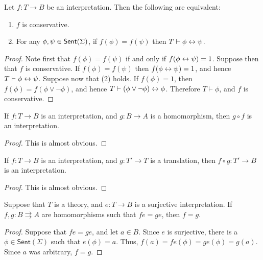 \begin{lemma} Let $f:T\to B$ be an interpretation.  Then the following
  are equivalent:
  \begin{enumerate}
\item $f$ is conservative.
\item For any $\phi ,\psi\in\mathsf{Sent}(\Sigma )$, if $f(\phi )=f(\psi )$ then
  $T\vdash \phi\leftrightarrow\psi$. \end{enumerate} \end{lemma}

\begin{proof} Note first that $f(\phi )=f(\psi )$ if and only if
  $f(\phi\leftrightarrow \psi)=1$.  Suppose then that $f$ is conservative.  If
  $f(\phi )=f(\psi )$ then $f(\phi\leftrightarrow\psi )=1$, and hence
  $T\vdash\phi\leftrightarrow\psi$.  Suppose now that (2) holds.  If $f(\phi
  )=1$, then $f(\phi )=f(\phi\vee\neg\phi )$, and hence $T\vdash
  (\phi\vee\neg\phi )\leftrightarrow \phi$.  Therefore $T\vdash\phi$, and $f$ is
  conservative.
\end{proof}

\begin{lemma} If $f:T\to B$ is an interpretation, and $g:B\to A$ is a
  homomorphism, then $g\circ f$ is an interpretation.  \end{lemma}

\begin{proof} This is almost obvious. \end{proof}

\begin{lemma} If $f:T\to B$ is an interpretation, and $g:T'\to T$ is a
  translation, then $f\circ g:T'\to B$ is an
  interpretation.  \end{lemma}

\begin{proof} This is almost obvious.  \end{proof}

\begin{lemma} Suppose that $T$ is a theory, and $e:T\to B$ is a
  surjective interpretation.  If $f,g:B\rightrightarrows A$ are
  homomorphisms such that $fe=ge$, then $f=g$.  \end{lemma}

\begin{proof} Suppose that $fe=ge$, and let $a\in B$.  Since $e$ is
  surjective, there is a $\phi\in\mathsf{Sent}(\Sigma )$ such that
  $e(\phi )=a$.  Thus, $f(a)=fe(\phi )=ge(\phi )=g(a)$.  Since $a$ was
  arbitrary, $f=g$. \end{proof}

